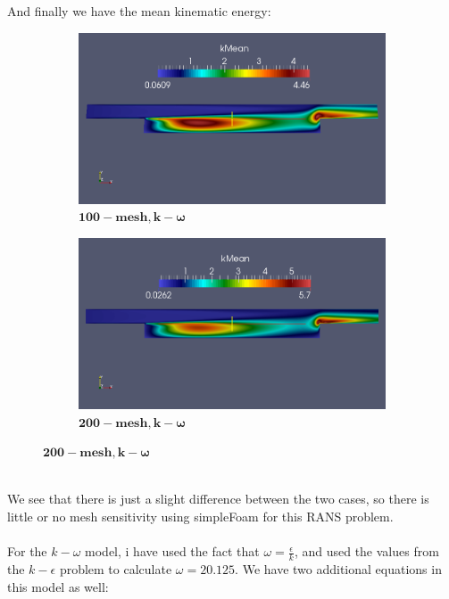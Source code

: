 \documentclass[a4paper,english,12pt,twoside]{article}
\begin{document}
\newpage
And finally we have the mean kinematic energy:\\
\begin{figure}[h!]
	\begin{subfigure}{0.5\textwidth}
		\includegraphics[width=0.95\linewidth]{simple_ke_10_mean_k.png}
		\caption{$\mathbf{100-mesh, k-\omega}$}
	\end{subfigure}
	\begin{subfigure}{0.5\textwidth}
		\includegraphics[width=0.95\linewidth]{simple_ke_20_mean_k.png}
		\caption{$\mathbf{200-mesh, k-\omega}$}
	\end{subfigure}
\end{figure}
\\
We see that there is just a slight difference between the two cases, so there is little or no mesh sensitivity using simpleFoam for this RANS problem.\\
\\
For the $k-\omega$ model, i have used the fact that $\omega = \frac{\epsilon}{k}$, and used the values from the $k-\epsilon$ problem to calculate $\omega = 20.125$. We have two additional equations in this model as well:\\
\\
\end{document}
